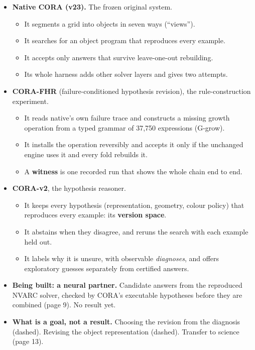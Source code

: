 \documentclass[11pt]{article}
\newcommand{\term}[1]{\textbf{#1}}
\begin{document}
\begin{itemize}
  \item \textbf{Native CORA (v23).} The frozen original system.
        \begin{itemize}
          \item It segments a grid into objects in seven ways (``views'').
          \item It searches for an object program that reproduces every example.
          \item It accepts only answers that survive leave-one-out rebuilding.
          \item Its whole harness adds other solver layers and gives two attempts.
        \end{itemize}
  \item \textbf{CORA-FHR} (failure-conditioned hypothesis revision), the rule-construction experiment.
        \begin{itemize}
          \item It reads native's own failure trace and constructs a missing growth operation from a typed grammar of
                37,750 expressions (G-grow).
          \item It installs the operation reversibly and accepts it only if the unchanged engine uses it and every
                fold rebuilds it.
          \item A \term{witness} is one recorded run that shows the whole chain end to end.
        \end{itemize}
  \item \textbf{CORA-v2}, the hypothesis reasoner.
        \begin{itemize}
          \item It keeps every hypothesis (representation, geometry, colour policy) that reproduces every example: its
                \term{version space}.
          \item It abstains when they disagree, and reruns the search with each example held out.
          \item It labels why it is unsure, with observable \emph{diagnoses}, and offers exploratory guesses
                separately from certified answers.
        \end{itemize}
  \item \textbf{Being built: a neural partner.} Candidate answers from the reproduced NVARC solver, checked by CORA's
        executable hypotheses before they are combined (page 9). No result yet.
  \item \textbf{What is a goal, not a result.} Choosing the revision from the diagnosis (dashed). Revising the object
        representation (dashed). Transfer to science (page 13).
\end{itemize}
\end{document}
